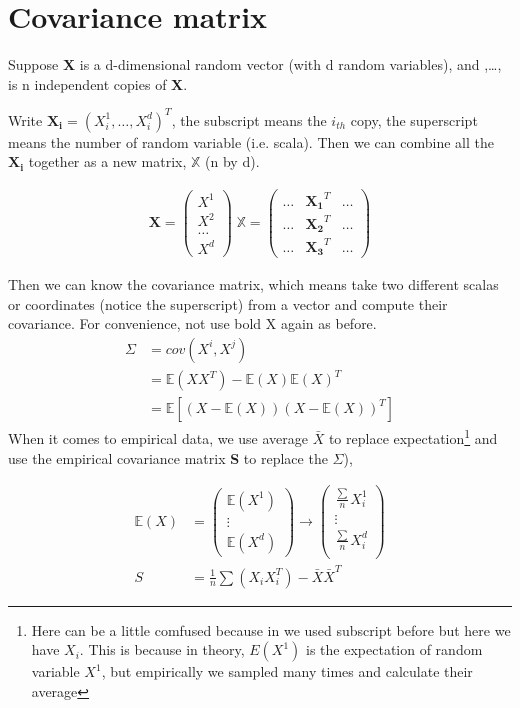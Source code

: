 \documentclass[11pt]{article}
\date{\today}
\begin{document}

\section{Covariance matrix}
\indent

Suppose \textbf{X} is a d-dimensional random vector (with d random variables), and ,\dots, is n independent copies of \textbf{X}.

Write $\bm{X_i} = (X_i^1,\dots,X_i^d)^T$, the subscript means the $i_{th}$ copy, the superscript means the number of random variable (i.e. scala). Then we can combine all the $\bm{X_i}$ together as a new matrix, $\mathbb{X}$ (n by d).

\begin{align}
  \bm{X} =
  \begin{pmatrix}
    X^1\\
    X^2\\
    \dots \\
    X^d
  \end{pmatrix}\;
%
  \mathbb{X} =
  \begin{pmatrix}
    \dots & \bm{X_1}^T & \dots\\
    \dots & \bm{X_2}^T & \dots\\
    \dots & \bm{X_3}^T & \dots
  \end{pmatrix}
\end{align}

Then we can know the covariance matrix, which means take two different scalas or coordinates (notice the superscript) from a vector and compute their covariance. For convenience, not use bold X again as before.
\begin{align}
  \label{eq1}
  \Sigma & = cov(X^i,X^j)\\
         & = \mathbb{E}(XX^T)-\mathbb{E}(X)\mathbb{E}(X)^T\\
         & = \mathbb{E}[(X-\mathbb{E}(X))(X-\mathbb{E}(X))^T]
\end{align}
When it comes to empirical data, we use average $\bar{X}$ to replace expectation\footnote{Here can be a little comfused because in we used subscript before but here we have $X_i$. This is because in theory, $E(X^1)$ is the expectation of random variable $X^1$, but empirically we sampled many times and calculate their average} and use the empirical covariance matrix \textbf{S} to replace the $\Sigma$), 

\begin{align}
  \mathbb{E}(X) & =
  \begin{pmatrix}
    \mathbb{E}(X^1)\\
    \vdots\\
    \mathbb{E}(X^d)
  \end{pmatrix}
  \rightarrow
  \begin{pmatrix}
    \frac{\sum}{n} X_i^1\\
    \vdots\\
    \frac{\sum}{n} X_i^d\\
  \end{pmatrix}\\
  S &= \frac{1}{n}\sum (X_iX_i^T) - \bar{X}\bar{X}^T
\end{align}
\end{document}
